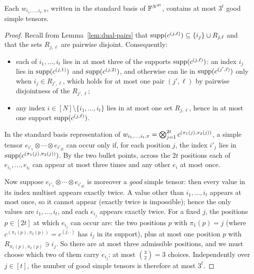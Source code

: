 \begin{lemma}
  \label{lem:claim-count}
  Each $w_{i_1, \dots, i_t, \pi}$, written in the standard basis of
  $\mathbb{F}^{N^{2t}}$, contains at most $3^t$ good simple tensors.
\end{lemma}
\begin{proof}
  Recall from Lemma~\ref{lem:dual-pairs} that
  $\operatorname{supp}(c^{(j,\ell)}) \subseteq \{i_j\} \cup R_{j,\ell}$ and that the sets
  $R_{j,\ell}$ are pairwise disjoint. Consequently:
  \begin{itemize}
    \item each of $i_1, \dots, i_t$ lies in at most three of the supports
      $\operatorname{supp}(c^{(j,\ell)})$: an index $i_j$ lies in $\operatorname{supp}(c^{(j,1)})$ and
      $\operatorname{supp}(c^{(j,2)})$, and otherwise can lie in $\operatorname{supp}(c^{(j',\ell)})$ only
      when $i_j \in R_{j',\ell}$, which holds for at most one pair $(j',\ell)$ by
      pairwise disjointness of the $R_{j',\ell}$;
    \item any index $i \in [N] \setminus \{i_1, \dots, i_t\}$ lies in at most one
      set $R_{j,\ell}$, hence in at most one support $\operatorname{supp}(c^{(j,\ell)})$.
  \end{itemize}
  In the standard basis representation of
  $w_{i_1, \dots, i_t, \pi} = \bigotimes_{j=1}^{2t} c^{(\pi_1(j),\pi_2(j))}$, a
  simple tensor $e_{i'_1} \otimes \cdots \otimes e_{i'_{2t}}$ can occur only if,
  for each position $j$, the index $i'_j$ lies in $\operatorname{supp}(c^{(\pi_1(j),\pi_2(j))})$.
  By the two bullet points, across the $2t$ positions each of
  $e_{i_1}, \dots, e_{i_t}$ can appear at most three times and any other $e_i$ at
  most once.

  Now suppose $e_{i'_1} \otimes \cdots \otimes e_{i'_{2t}}$ is moreover a
  \emph{good} simple tensor: then every value in its index multiset appears
  exactly twice. A value other than $i_1, \dots, i_t$ appears at most once, so it
  cannot appear (exactly twice is impossible); hence the only values are
  $i_1, \dots, i_t$, and each $e_{i_j}$ appears exactly twice. For a fixed $j$,
  the positions $p \in [2t]$ at which $e_{i_j}$ can occur are: the two positions
  $p$ with $\pi_1(p) = j$ (where $c^{(\pi_1(p),\pi_2(p))} = c^{(j,\cdot)}$ has
  $i_j$ in its support), plus at most one position $p$ with
  $R_{\pi_1(p),\pi_2(p)} \ni i_j$. So there are at most three admissible
  positions, and we must choose which two of them carry $e_{i_j}$: at most
  $\binom{3}{2} = 3$ choices. Independently over $j \in [t]$, the number of good
  simple tensors is therefore at most $3^t$.
\end{proof}

